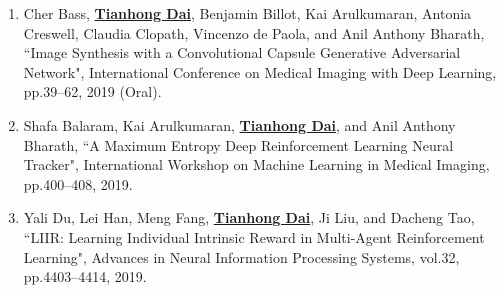 \begin{enumerate}
	\item Cher Bass, \underline{\textbf{Tianhong Dai}}, Benjamin Billot, Kai Arulkumaran, Antonia Creswell, Claudia Clopath, Vincenzo de Paola, and Anil Anthony Bharath, ``Image Synthesis with a Convolutional Capsule Generative Adversarial Network", International Conference on Medical Imaging with Deep Learning, pp.39--62, 2019 (Oral).
	\item Shafa Balaram, Kai Arulkumaran, \underline{\textbf{Tianhong Dai}}, and Anil Anthony Bharath, ``A Maximum Entropy Deep Reinforcement Learning Neural Tracker", International Workshop on Machine Learning in Medical Imaging, pp.400--408, 2019.
	\item Yali Du, Lei Han, Meng Fang, \underline{\textbf{Tianhong Dai}}, Ji Liu, and Dacheng Tao, ``LIIR: Learning Individual Intrinsic Reward in Multi-Agent Reinforcement Learning", Advances in Neural Information Processing Systems, vol.32, pp.4403--4414, 2019.
\end{enumerate}